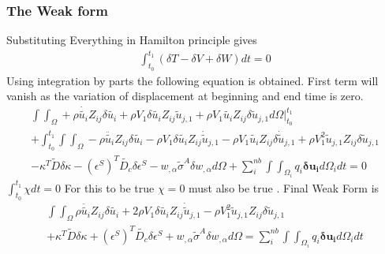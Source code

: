 \documentclass[9pt]{beamer}
\begin{document}
\begin{frame}
\frametitle{The Weak form} 
Substituting Everything in Hamilton principle gives
\begin{equation*}
\begin{split}
 \int_{t_0}^{t_1} \left( \delta T - \delta V + \delta W \right) dt    =  0 
\end{split} 
\end{equation*}
Using integration by parts the following equation is  obtained. First term will vanish as the variation of displacement at beginning and end time is zero.  
\begin{equation*}
\begin{split}
 \int \int_\Omega 
+
\rho \dot{\tilde{u_i}} Z_{ij} \delta \tilde{u_i}
+
\rho V_1 \delta {\tilde{u_i}} Z_{ij} \tilde{u}_{j,1} 
+  
\rho V_1 {\tilde{u_i}} Z_{ij} \delta \tilde{u}_{j,1}  
 d \Omega  \Big|_{t_0}^{t_1} 
 \\ +
 \int_{t_0}^{t_1} \int \int_\Omega 
-
\rho \ddot{\tilde{u_i}} Z_{ij} \delta {\tilde{u_i}}
-
\rho V_1 \delta {\tilde{u_i}} Z_{ij} \dot{\tilde{u}}_{j,1} 
-  
\rho V_1  \tilde{u_i} Z_{ij} \delta \dot{\tilde{u}}_{j,1} 
+
\rho V_1^2 \tilde{u}_{j,1} Z_{ij} \delta \tilde{u}_{j,1}
\\ 
- 
\kappa^T \tilde{D} \delta\kappa 
-
\left(\epsilon^S\right)^T \tilde{D_c} \delta\epsilon^S 
- 
 w_{, \alpha} \tilde{\sigma}^A  \delta w_{, \alpha}  d \Omega     
 +   
 \sum_i^{nb}   \int  \int_{\Omega_i} q_i \mathbf{\delta u_i}  d \Omega_i dt = 0
\end{split} 
\end{equation*}
$
\int_{t_0}^{t_1} \chi dt = 0
$
For this to be true
$
 \chi  = 0
$  must also be true . Final Weak Form is 
\begin{equation*}
\begin{split}
 \int \int_\Omega 
\rho \ddot{\tilde{u_i}} Z_{ij} \delta {\tilde{u_i}}
+
2 \rho V_1 \delta {\tilde{u_i}} Z_{ij} \dot{\tilde{u}}_{j,1} 
-
\rho V_1^2 \tilde{u}_{j,1} Z_{ij} \delta \tilde{u}_{j,1}
\\ 
+
\kappa^T \tilde{D} \delta\kappa 
+
\left(\epsilon^S\right)^T \tilde{D_c} \delta\epsilon^S 
+ 
 w_{, \alpha} \tilde{\sigma}^A  \delta w_{, \alpha} d \Omega     
=  
 \sum_i^{nb}   \int  \int_{\Omega_i} q_i \mathbf{\delta u_i}  d \Omega_i dt
\end{split} 
\end{equation*}


\end{frame}
\end{document}
